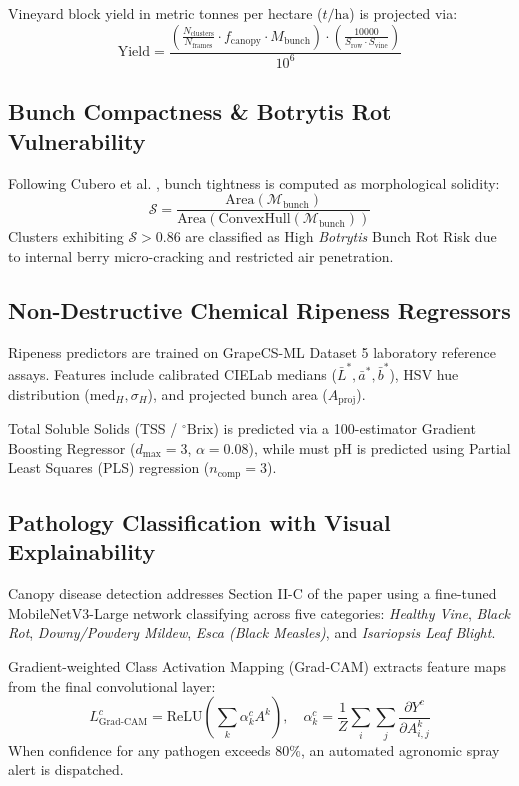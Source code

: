 \documentclass[conference]{IEEEtran}
\begin{document}
Vineyard block yield in metric tonnes per hectare ($t/\text{ha}$) is projected via:
\begin{equation}
\text{Yield} = \frac{\left( \frac{N_{\text{clusters}}}{N_{\text{frames}}} \cdot f_{\text{canopy}} \cdot M_{\text{bunch}} \right) \cdot \left(\frac{10000}{S_{\text{row}} \cdot S_{\text{vine}}}\right)}{10^6}
\end{equation}

\subsection{Bunch Compactness \& Botrytis Rot Vulnerability}
Following Cubero et al. \cite{cubero2014morphology}, bunch tightness is computed as morphological solidity:
\begin{equation}
\mathcal{S} = \frac{\text{Area}(\mathcal{M}_{\text{bunch}})}{\text{Area}(\text{ConvexHull}(\mathcal{M}_{\text{bunch}}))}
\end{equation}
Clusters exhibiting $\mathcal{S} > 0.86$ are classified as High \textit{Botrytis} Bunch Rot Risk due to internal berry micro-cracking and restricted air penetration.

\subsection{Non-Destructive Chemical Ripeness Regressors}
Ripeness predictors are trained on GrapeCS-ML Dataset 5 laboratory reference assays. Features include calibrated CIELab medians ($\bar{L}^*, \bar{a}^*, \bar{b}^*$), HSV hue distribution ($\text{med}_H, \sigma_H$), and projected bunch area ($A_{\text{proj}}$). 

Total Soluble Solids (TSS / $^\circ\text{Brix}$) is predicted via a 100-estimator Gradient Boosting Regressor ($d_{\max}=3$, $\alpha=0.08$), while must $\text{pH}$ is predicted using Partial Least Squares (PLS) regression ($n_{\text{comp}}=3$).

\subsection{Pathology Classification with Visual Explainability}
Canopy disease detection addresses Section II-C of the paper using a fine-tuned MobileNetV3-Large network classifying across five categories: \textit{Healthy Vine}, \textit{Black Rot}, \textit{Downy/Powdery Mildew}, \textit{Esca (Black Measles)}, and \textit{Isariopsis Leaf Blight}. 

Gradient-weighted Class Activation Mapping (Grad-CAM) \cite{selvaraju2017gradcam} extracts feature maps from the final convolutional layer:
\begin{equation}
L_{\text{Grad-CAM}}^c = \text{ReLU}\left( \sum_k \alpha_k^c A^k \right), \quad \alpha_k^c = \frac{1}{Z}\sum_i \sum_j \frac{\partial Y^c}{\partial A_{i,j}^k}
\end{equation}
When confidence for any pathogen exceeds $80\%$, an automated agronomic spray alert is dispatched.
\end{document}
